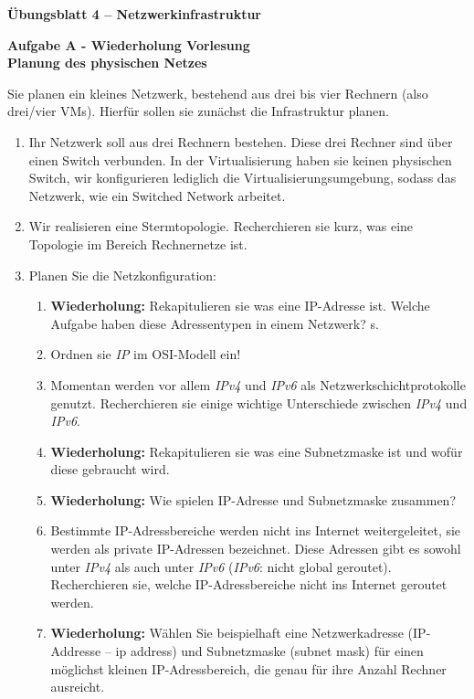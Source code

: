 \documentclass[paper=a4,fontsize=11pt]{scrartcl}%
\numberwithin{equation}{section}
\begin{document}
\begin{center}
\Large{\textbf{Übungsblatt 4 -- Netzwerkinfrastruktur}}
\end{center}

\begin{center}\Large{\textbf{Aufgabe A - Wiederholung Vorlesung\\Planung des physischen Netzes}}\end{center}

Sie planen ein kleines Netzwerk, bestehend aus drei bis vier Rechnern (also drei/vier VMs). Hierfür sollen sie zunächst die Infrastruktur planen.
\begin{enumerate}
	\item Ihr Netzwerk soll aus drei Rechnern bestehen. Diese drei Rechner sind über einen Switch verbunden. In der Virtualisierung haben sie keinen physischen Switch, wir konfigurieren lediglich die Virtualisierungsumgebung, sodass das Netzwerk, wie ein Switched Network arbeitet.\\
	\item Wir realisieren eine Stermtopologie. Recherchieren sie kurz, was eine Topologie im Bereich Rechnernetze ist.
	\item Planen Sie die Netzkonfiguration:
	\begin{enumerate}
		\item  \textbf{Wiederholung:} Rekapitulieren sie was eine IP-Adresse ist. Welche Aufgabe haben diese Adressentypen in einem Netzwerk? s. \cite[S. 331ff]{Kurose2012}
		\item Ordnen sie \emph{IP} im OSI-Modell ein!
		\item Momentan werden vor allem \emph{IPv4} und \emph{IPv6} als Netzwerkschichtprotokolle genutzt. Recherchieren sie einige wichtige Unterschiede zwischen \emph{IPv4} und \emph{IPv6}.
		\item  \textbf{Wiederholung:} Rekapitulieren sie was eine Subnetzmaske ist und wofür diese gebraucht wird.
		\item \textbf{Wiederholung:} Wie spielen IP-Adresse und Subnetzmaske zusammen?
		\item Bestimmte IP-Adressbereiche werden nicht ins Internet weitergeleitet, sie werden als private IP-Adressen bezeichnet. Diese Adressen gibt es sowohl unter \emph{IPv4} als auch unter \emph{IPv6} (\emph{IPv6}: nicht global geroutet). Recherchieren sie, welche IP-Adressbereiche nicht ins Internet geroutet werden.
		\item \textbf{Wiederholung:} Wählen Sie beispielhaft eine Netzwerkadresse (IP-Addresse -- ip address) und Subnetzmaske (subnet mask) für einen möglichst kleinen IP-Adressbereich, die genau für ihre Anzahl Rechner ausreicht.\\

\end{enumerate}
\end{enumerate}
\end{document}
